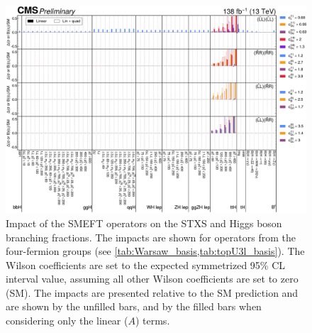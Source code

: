 \begin{landscape}
  \begin{figure}
    \centering
    \includegraphics[width=\pagewidth]{Figures/EFT/HIG-21-018-Figure_016.pdf}
    \caption[Impact of SMEFT Operators in the SMEFT Basis (3)]{Impact of the SMEFT operators on the STXS and Higgs boson branching fractions. The impacts are shown for operators from the four-fermion groups (see \cref{tab:Warsaw_basis,tab:topU3l_basis}). The Wilson coefficients are set to the expected symmetrized 95\% CL interval value, assuming all other Wilson coefficients are set to zero (SM). The impacts are presented relative to the SM prediction and are shown by the unfilled bars, and by the filled bars when considering only the linear ($A$) terms.}\label{fig:smeft_parametrisation_part3}
  \end{figure}
\end{landscape}